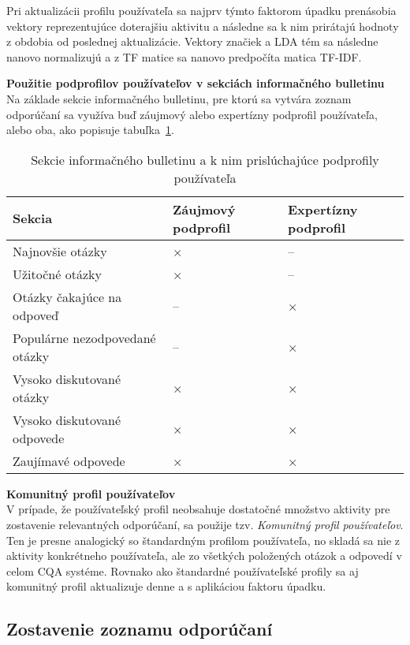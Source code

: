 Pri aktualizácii profilu používateľa sa najprv týmto faktorom úpadku prenásobia vektory reprezentujúce doterajšiu aktivitu
a následne sa k nim prirátajú hodnoty z obdobia od poslednej aktualizácie. Vektory značiek a LDA tém sa následne nanovo
normalizujú a z TF matice sa nanovo predpočíta matica TF-IDF.

\textbf{Použitie podprofilov používateľov v sekciách informačného bulletinu}\\
Na základe sekcie informačného bulletinu, pre ktorú sa vytvára zoznam odporúčaní sa využíva buď záujmový alebo
expertízny podprofil používateľa, alebo oba, ako popisuje tabuľka~\ref{tab:sections}.

\begin{table}[h]
\label{tab:sections}
\centering
\caption{Sekcie informačného bulletinu a k nim prislúchajúce podprofily používateľa}
\begin{tabular}{|m{7cm}|>{\centering\arraybackslash}m{2.5cm}|>{\centering\arraybackslash}m{2.6cm}|}
\hline
\textbf{Sekcia} & \textbf{Záujmový podprofil} & \textbf{Expertízny podprofil} \\\hline
Najnovšie otázky               & ×  & -- \\\hline
Užitočné otázky                & ×  & -- \\\hline
Otázky čakajúce na odpoveď     & -- & ×  \\\hline
Populárne nezodpovedané otázky & -- & ×  \\\hline
Vysoko diskutované otázky      & ×  & ×  \\\hline
Vysoko diskutované odpovede    & ×  & ×  \\\hline
Zaujímavé odpovede             & ×  & ×  \\\hline
\end{tabular}
\end{table}

\textbf{Komunitný profil používateľov}\\
V prípade, že používateľský profil neobsahuje dostatočné množstvo aktivity pre zostavenie relevantných odporúčaní,
sa použije tzv. \textit{Komunitný profil používateľov}. Ten je presne analogický so štandardným profilom používateľa,
no skladá sa nie z aktivity konkrétneho používateľa, ale zo všetkých položených otázok a odpovedí v celom CQA systéme.
Rovnako ako štandardné používateľské profily sa aj komunitný profil aktualizuje denne a s aplikáciou faktoru úpadku.


\subsection{Zostavenie zoznamu odporúčaní}

